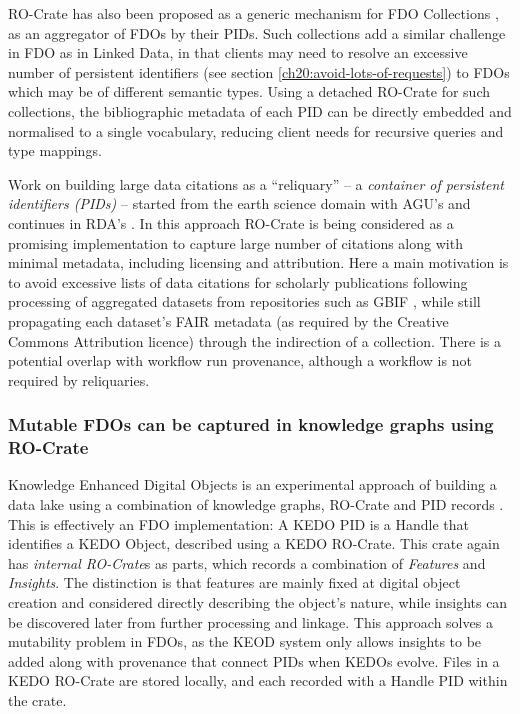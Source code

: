 RO-Crate has also been proposed as a generic mechanism for FDO Collections \cite{Soiland-Reyes 2023d}, as an aggregator of FDOs by their PIDs. Such collections add a similar challenge in FDO as in Linked Data, in that clients may need to resolve an excessive number of persistent identifiers (see section \vref{ch20:avoid-lots-of-requests}) to FDOs which may be of different semantic types. 
Using a detached RO-Crate for such collections, the bibliographic metadata of each PID can be directly embedded and normalised to a single vocabulary, reducing client needs for recursive queries and type mappings. 
 
Work on building large data citations as a ``reliquary'' -- a \emph{container of persistent identifiers (PIDs)} \cite{Buck 2022} -- started from the earth science domain with AGU's  and continues in RDA's . In this approach RO-Crate is being considered as a promising implementation to capture large number of citations along with minimal metadata, including licensing and attribution. Here a main motivation is to avoid excessive lists of data citations for scholarly publications following processing of aggregated datasets from repositories such as GBIF \cite{GBIF 2021}, while still propagating each dataset's FAIR metadata (as required by the Creative Commons Attribution licence) through the indirection of a collection. There is a potential overlap with workflow run provenance, although a workflow is not required by reliquaries.


\subsubsection{Mutable FDOs can be captured in knowledge graphs using RO-Crate}
\label{ch61:datalakes}

Knowledge Enhanced Digital Objects  \cite{Luo 2022} is an experimental approach of building a data lake using a combination of knowledge graphs, RO-Crate and PID records \cite{Luo 2023}. This is effectively an FDO implementation: A KEDO PID is a Handle that identifies a KEDO Object, described using a KEDO RO-Crate. This crate again has \emph{internal RO-Crate}s as parts, which records a combination of \emph{Features} and \emph{Insights}. The distinction is that features are mainly fixed at digital object creation and considered directly describing the object's nature, while insights can be discovered later from further processing and linkage. This approach solves a mutability problem in FDOs, as the KEOD system only allows insights to be added along with provenance that connect PIDs when KEDOs evolve. Files in a KEDO RO-Crate are stored locally, and each recorded with a Handle PID within the crate.

